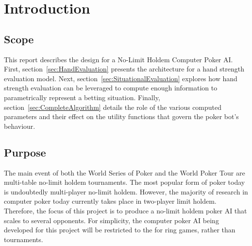 
\clearpage



\chapter{Introduction}
\label{sec:Intro}

\section{Scope}
\label{sec:Scope}

This report describes the design for a No-Limit Holdem Computer Poker AI.
First, section~\ref{sec:HandEvaluation} presents the architecture for a hand strength evaluation model.
Next, section~\ref{sec:SituationalEvaluation} explores how hand strength evaluation can be leveraged to compute enough information to parametrically represent a betting situation.
Finally, section~\ref{sec:CompleteAlgorithm} details the role of the various computed parameters and their effect on the utility functions that govern the poker bot's behaviour.

\section{Purpose}
\label{sec:Purpose}

The main event of both the World Series of Poker and the World Poker Tour are multi-table no-limit holdem tournaments.
The most popular form of poker today is undoubtedly multi-player no-limit holdem.
However, the majority of research in computer poker today currently takes place in two-player limit holdem.
Therefore, the focus of this project is to produce a no-limit holdem poker AI that scales to several opponents.
For simplicity, the computer poker AI being developed for this project will be restricted to the for ring games, rather than tournaments.



 
